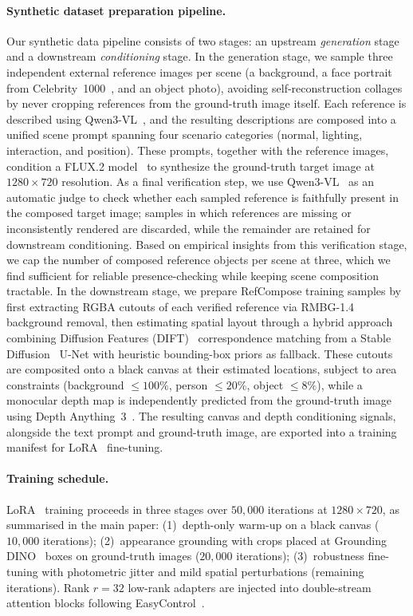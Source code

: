 \paragraph{Synthetic dataset preparation pipeline.}
Our synthetic data pipeline consists of two stages: an upstream \emph{generation} stage and a downstream \emph{conditioning} stage.
In the generation stage, we sample three independent external reference images per scene (a background, a face portrait from Celebrity~1000~\cite{tonyassi2024celebrity1000}, and an object photo), avoiding self-reconstruction collages by never cropping references from the ground-truth image itself.
Each reference is described using Qwen3-VL~\cite{qwen3vl}, and the resulting descriptions are composed into a unified scene prompt spanning four scenario categories (normal, lighting, interaction, and position).
These prompts, together with the reference images, condition a FLUX.2 model~\cite{blackforestlabs2025flux2} to synthesize the ground-truth target image at $1280 \times 720$ resolution.
As a final verification step, we use Qwen3-VL~\cite{qwen3vl} as an automatic judge to check whether each sampled reference is faithfully present in the composed target image; samples in which references are missing or inconsistently rendered are discarded, while the remainder are retained for downstream conditioning.
Based on empirical insights from this verification stage, we cap the number of composed reference objects per scene at three, which we find sufficient for reliable presence-checking while keeping scene composition tractable.
In the downstream stage, we prepare RefCompose training samples by first extracting RGBA cutouts of each verified reference via RMBG-1.4~\cite{bria2024rmbg} background removal, then estimating spatial layout through a hybrid approach combining Diffusion Features (DIFT)~\cite{tang2023emergent} correspondence matching from a Stable Diffusion~\cite{rombach2022ldm} U-Net with heuristic bounding-box priors as fallback.
These cutouts are composited onto a black canvas at their estimated locations, subject to area constraints (background $\leq 100\%$, person $\leq 20\%$, object $\leq 8\%$), while a monocular depth map is independently predicted from the ground-truth image using Depth Anything~3~\cite{depthanything3}.
The resulting canvas and depth conditioning signals, alongside the text prompt and ground-truth image, are exported into a training manifest for LoRA~\cite{hu2022lora} fine-tuning.

\paragraph{Training schedule.}
LoRA~\cite{hu2022lora} training proceeds in three stages over $50{,}000$ iterations at $1280 \times 720$, as summarised in the main paper:
(1)~depth-only warm-up on a black canvas ($10{,}000$ iterations);
(2)~appearance grounding with crops placed at Grounding DINO~\cite{liu2023grounding} boxes on ground-truth images ($20{,}000$ iterations);
(3)~robustness fine-tuning with photometric jitter and mild spatial perturbations (remaining iterations).
Rank $r{=}32$ low-rank adapters are injected into double-stream attention blocks following EasyControl~\cite{zhang2025easycontrol}.

\FloatBarrier
